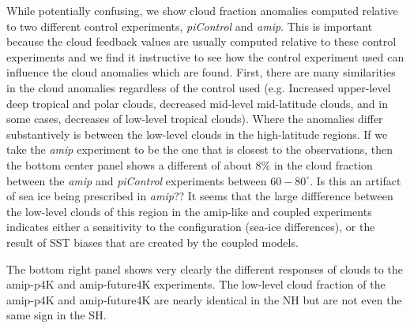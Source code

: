\documentclass[draft]{agujournal2019}
\begin{document}
While potentially confusing, we show cloud fraction anomalies computed relative to two different control experiments, \textit{piControl} and \textit{amip}.  This is important because the cloud feedback values are usually computed relative to these control experiments and we find it instructive to see how the control experiment used can influence the cloud anomalies which are found.  First, there are many similarities in the cloud anomalies regardless of the control used (e.g. Increased upper-level deep tropical and polar clouds, decreased mid-level mid-latitude clouds, and in some cases, decreases of low-level tropical clouds).  Where the anomalies differ substantively is between the low-level clouds in the high-latitude regions.  If we take the \textit{amip} experiment to be the one that is closest to the observations, then the bottom center panel shows a different of about 8\% in the cloud fraction between the \textit{amip} and \textit{piControl} experiments between $60-80^\circ$.  Is this an artifact of sea ice being prescribed in \textit{amip}??  It seems that the large diffference between the low-level clouds of this region in the amip-like and coupled experiments indicates either a sensitivity to the configuration (sea-ice differences), or the result of SST biases that are created by the coupled models.  

The bottom right panel shows very clearly the different responses of clouds to the amip-p4K and amip-future4K experiments.  The low-level cloud fraction of the amip-p4K and amip-future4K are nearly identical in the NH but are not even the same sign in the SH.   
\end{document}
